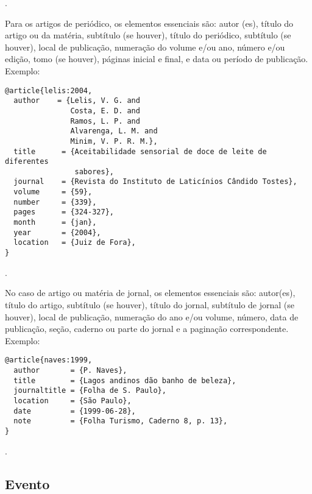 \noindent
{}.

\vspace*{1em}

Para os artigos de periódico, os elementos essenciais são: autor (es), título do artigo ou da matéria, subtítulo (se houver), título do periódico, subtítulo (se houver), local de publicação, numeração do volume e/ou ano, número e/ou edição, tomo (se houver), páginas inicial e final, e data ou período de publicação.
Exemplo:

\vspace*{1em}

\begin{verbatim}
@article{lelis:2004,
  author    = {Lelis, V. G. and
               Costa, E. D. and
               Ramos, L. P. and
               Alvarenga, L. M. and
               Minim, V. P. R. M.},
  title      = {Aceitabilidade sensorial de doce de leite de diferentes
                sabores},
  journal    = {Revista do Instituto de Laticínios Cândido Tostes},
  volume     = {59},
  number     = {339},
  pages      = {324-327},
  month      = {jan},
  year       = {2004},
  location   = {Juiz de Fora},
}
\end{verbatim}

\noindent
{}.

\vspace*{1em}

No caso de artigo ou matéria de jornal, os elementos essenciais são: autor(es), título do artigo, subtítulo (se houver), título do jornal, subtítulo de jornal (se houver), local de publicação, numeração do ano e/ou volume, número, data de publicação, seção, caderno ou parte do jornal e a paginação correspondente.
Exemplo:

\vspace*{1em}

\begin{verbatim}
@article{naves:1999,
  author       = {P. Naves},
  title        = {Lagos andinos dão banho de beleza},
  journaltitle = {Folha de S. Paulo},
  location     = {São Paulo},
  date         = {1999-06-28},
  note         = {Folha Turismo, Caderno 8, p. 13},
}
\end{verbatim}

\noindent
{}.

\subsection{Evento}


